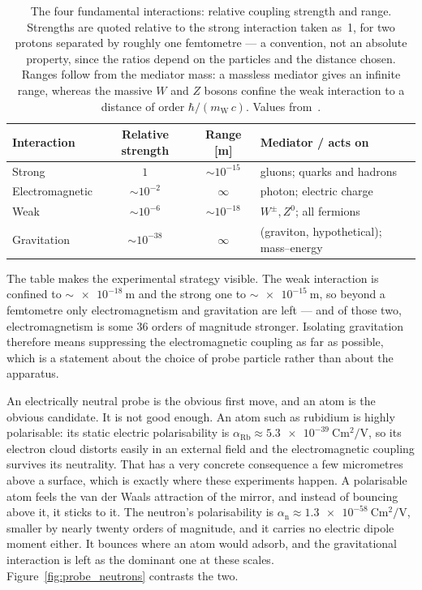 \documentclass[a4paper,headsepline,oneside,11pt]{scrartcl}
\begin{document}
\begin{table}[htbp]
  \centering
  \begin{tabularx}{\linewidth}{@{}l c c X@{}}
    \toprule
    \textbf{Interaction} & \textbf{Relative strength} & \textbf{Range [m]} &
    \textbf{Mediator / acts on} \\
    \midrule
    Strong          & $1$          & ${\sim}10^{-15}$ & gluons; quarks and hadrons \\
    Electromagnetic & ${\sim}10^{-2}$ & $\infty$      & photon; electric charge \\
    Weak            & ${\sim}10^{-6}$ & ${\sim}10^{-18}$ & $W^{\pm}, Z^{0}$; all fermions \\
    Gravitation     & ${\sim}10^{-38}$ & $\infty$     & (graviton, hypothetical); mass--energy \\
    \bottomrule
  \end{tabularx}
  \caption{The four fundamental interactions: relative coupling strength and
  range. Strengths are quoted relative to the strong interaction taken as~1,
  for two protons separated by roughly one femtometre --- a convention, not an
  absolute property, since the ratios depend on the particles and the distance
  chosen. Ranges follow from the mediator mass: a massless mediator gives an
  infinite range, whereas the massive $W$ and $Z$ bosons confine the weak
  interaction to a distance of order $\hbar / (m_\mathrm{W}\,c)$. Values
  from~\cite{PDG2024}.}
  \label{tab:forces}
\end{table}

The table makes the experimental strategy visible. The weak interaction is
confined to ${\sim}\SI{e-18}{\metre}$ and the strong one to ${\sim}\SI{e-15}{\metre}$, so
beyond a femtometre only electromagnetism and gravitation are left --- and of
those two, electromagnetism is some $36$ orders of magnitude stronger.
Isolating gravitation therefore means suppressing the electromagnetic coupling as
far as possible, which is a statement about the choice of probe particle rather
than about the apparatus.

An electrically neutral probe is the obvious first move, and an atom is the
obvious candidate. It is not good enough. An atom such as rubidium is highly
polarisable: its static electric polarisability is
$\alpha_\mathrm{Rb} \approx \SI{5.3e-39}{\coulomb\metre\squared\per\volt}$, so
its electron cloud distorts easily in an external field and the electromagnetic
coupling survives its neutrality. That has a very concrete consequence a few
micrometres above a surface, which is exactly where these experiments happen. A
polarisable atom feels the van der Waals attraction of the mirror, and instead
of bouncing above it, it sticks to it. The neutron's polarisability is
$\alpha_\mathrm{n} \approx \SI{1.3e-58}{\coulomb\metre\squared\per\volt}$,
smaller by nearly twenty orders of magnitude, and it carries no electric dipole
moment either. It bounces where an atom would adsorb, and the
gravitational interaction is left as the dominant one at these
scales.
Figure~\ref{fig:probe_neutrons} contrasts the two.
\end{document}
